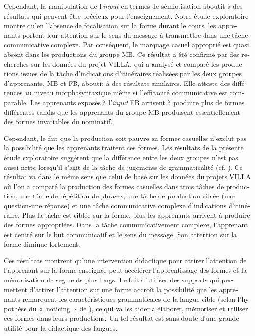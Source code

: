 \documentclass[output=paper]{langscibook}
\begin{document}
\begin{otherlanguage}{french}
Cependant, la manipulation de l’\textit{input} en termes de sémiotisation aboutit à des résultats qui peuvent être précieux pour l’enseignement. Notre étude exploratoire montre qu’en l’absence de focalisation sur la forme durant le cours, les apprenants portent leur attention sur le sens du message à transmettre dans une tâche communicative complexe. Par conséquent, le marquage casuel approprié est quasi absent dans les productions du groupe MB. Ce résultat a été confirmé par des recherches sur les données du projet VILLA. \citet{Latos2021} qui a analysé et comparé les productions issues de la tâche d’indications d’itinéraires réalisées par les deux groupes d’apprenants, MB et FB, aboutit à des résultats similaires. Elle atteste des différences au niveau morphosyntaxique même si l’efficacité communicative est comparable. Les apprenants exposés à l’\textit{input} FB arrivent à produire plus de formes différentes tandis que les apprenants du groupe MB produisent essentiellement des formes invariables du nominatif.

Cependant, le fait que la production soit pauvre en formes casuelles n’exclut pas la possibilité que les apprenants traitent ces formes. Les résultats de la présente étude exploratoire suggèrent que la différence entre les deux groupes n’est pas aussi nette lorsqu’il s’agit de la tâche de jugements de grammaticalité (cf. ). Ce résultat va dans le même sens que celui de \citet{WatorekEtAl2016} basé sur les données du projets VILLA où l’on a comparé la production des formes casuelles dans trois tâches de production, une tâche de répétition de phrases, une tâche de production ciblée (une question-une réponse) et une tâche communicative complexe d’indications d’itinéraire. Plus la tâche est ciblée sur la forme, plus les apprenants arrivent à produire des formes appropriées. Dans la tâche communicativement complexe, l’apprenant est centré sur le but communicatif et le sens du message. Son attention sur la forme diminue fortement.

Ces résultats montrent qu’une intervention didactique pour attirer l’attention de l’apprenant sur la forme enseignée peut accélérer l’apprentissage des formes et la mémorisation de segments plus longs. Le fait d’utiliser des supports qui permettent d’attirer l’attention sur une forme accroît la possibilité que les apprenants remarquent les caractéristiques grammaticales de la langue cible (selon l’hypothèse du «~noticing~» de \citealt{Schmidt1990}), ce qui va les aider à élaborer, mémoriser et utiliser ces formes dans leurs productions. Un tel résultat est sans doute d’une grande utilité pour la didactique des langues.



\end{otherlanguage}
\end{document}
